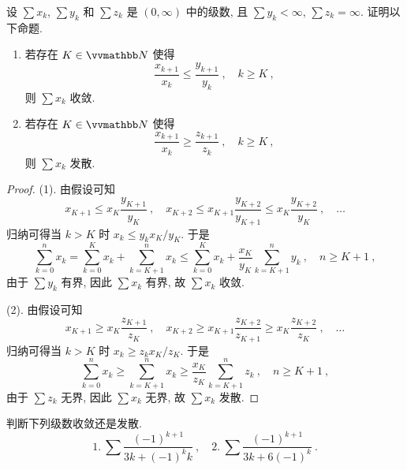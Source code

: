 \begin{exercise}
    设 \(\sum x_k\), \(\sum y_k\) 和 \(\sum z_k\) 是 \((0, \infty)\) 中的级数, 且 \(\sum y_k < \infty\), \(\sum z_k = \infty\). 证明以下命题.
    \begin{enumerate}
        \item 若存在 \(K \in \N\) 使得
        \[
            \frac{x_{k + 1}}{x_k} \leq \frac{y_{k + 1}}{y_k}\ ,\quad k \geq K\ ,
        \]
        则 \(\sum x_k\) 收敛.
        \item 若存在 \(K \in \N\) 使得
        \[
            \frac{x_{k + 1}}{x_k} \geq \frac{z_{k + 1}}{z_k}\ ,\quad k \geq K\ ,
        \]
        则 \(\sum x_k\) 发散.
    \end{enumerate}
\end{exercise}

\begin{proof}
    (1). 由假设可知
    \[
        x_{K + 1} \leq x_K \frac{y_{K + 1}}{y_K}\ ,\quad x_{K + 2} \leq x_{K + 1} \frac{y_{K + 2}}{y_{K + 1}} \leq x_K \frac{y_{K + 2}}{y_K}\ ,\quad \ldots
    \]
    归纳可得当 \(k > K\) 时 \(x_k \leq y_k x_K / y_K\). 于是
    \[
        \sum_{k = 0}^n x_k = \sum_{k = 0}^K x_k + \sum_{k = K + 1}^n x_k \leq \sum_{k = 0}^K x_k + \frac{x_K}{y_K} \sum_{k = K + 1}^n y_k\ ,\quad n \geq K + 1\ ,
    \]
    由于 \(\sum y_k\) 有界, 因此 \(\sum x_k\) 有界, 故 \(\sum x_k\) 收敛.

    (2). 由假设可知
    \[
        x_{K + 1} \geq x_K \frac{z_{K + 1}}{z_K}\ ,\quad x_{K + 2} \geq x_{K + 1} \frac{z_{K + 2}}{z_{K + 1}} \geq x_K \frac{z_{K + 2}}{z_K}\ ,\quad \ldots
    \]
    归纳可得当 \(k > K\) 时 \(x_k \geq z_k x_K / z_K\). 于是
    \[
        \sum_{k = 0}^n x_k \geq \sum_{k = K + 1}^n x_k \geq \frac{x_K}{z_K} \sum_{k = K + 1}^n z_k\ ,\quad n \geq K + 1\ ,
    \]
    由于 \(\sum z_k\) 无界, 因此 \(\sum x_k\) 无界, 故 \(\sum x_k\) 发散.
\end{proof}

\begin{exercise}
    判断下列级数收敛还是发散.
    \[
        1.\ \sum \frac{(- 1)^{k + 1}}{3 k + (- 1)^k k}\ ,\quad 2.\ \sum \frac{(- 1)^{k + 1}}{3 k + 6 (- 1)^k}\ .
    \]
\end{exercise}

